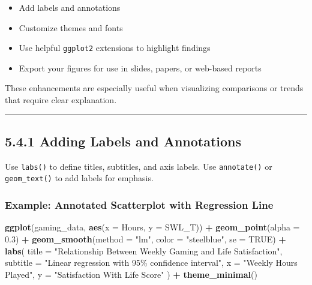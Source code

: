 \documentclass[
]{book}
\newenvironment{Shaded}{\begin{snugshade}}{\end{snugshade}}
\newcommand{\AttributeTok}[1]{\textcolor[rgb]{0.13,0.29,0.53}{#1}}
\newcommand{\ConstantTok}[1]{\textcolor[rgb]{0.56,0.35,0.01}{#1}}
\newcommand{\FloatTok}[1]{\textcolor[rgb]{0.00,0.00,0.81}{#1}}
\newcommand{\FunctionTok}[1]{\textcolor[rgb]{0.13,0.29,0.53}{\textbf{#1}}}
\newcommand{\NormalTok}[1]{#1}
\newcommand{\SpecialCharTok}[1]{\textcolor[rgb]{0.81,0.36,0.00}{\textbf{#1}}}
\newcommand{\StringTok}[1]{\textcolor[rgb]{0.31,0.60,0.02}{#1}}
\providecommand{\tightlist}{%
  \setlength{\itemsep}{0pt}\setlength{\parskip}{0pt}}
\begin{document}
\begin{itemize}
\tightlist
\item
  Add labels and annotations
\item
  Customize themes and fonts
\item
  Use helpful \texttt{ggplot2} extensions to highlight findings
\item
  Export your figures for use in slides, papers, or web-based reports
\end{itemize}

These enhancements are especially useful when visualizing comparisons or trends that require clear explanation.

\begin{center}\rule{0.5\linewidth}{0.5pt}\end{center}

\subsection{5.4.1 Adding Labels and Annotations}\label{adding-labels-and-annotations}

Use \texttt{labs()} to define titles, subtitles, and axis labels. Use \texttt{annotate()} or \texttt{geom\_text()} to add labels for emphasis.

\subsubsection{Example: Annotated Scatterplot with Regression Line}\label{example-annotated-scatterplot-with-regression-line}

\begin{Shaded}
\begin{Highlighting}[]
\FunctionTok{ggplot}\NormalTok{(gaming\_data, }\FunctionTok{aes}\NormalTok{(}\AttributeTok{x =}\NormalTok{ Hours, }\AttributeTok{y =}\NormalTok{ SWL\_T)) }\SpecialCharTok{+}
  \FunctionTok{geom\_point}\NormalTok{(}\AttributeTok{alpha =} \FloatTok{0.3}\NormalTok{) }\SpecialCharTok{+}
  \FunctionTok{geom\_smooth}\NormalTok{(}\AttributeTok{method =} \StringTok{"lm"}\NormalTok{, }\AttributeTok{color =} \StringTok{"steelblue"}\NormalTok{, }\AttributeTok{se =} \ConstantTok{TRUE}\NormalTok{) }\SpecialCharTok{+}
  \FunctionTok{labs}\NormalTok{(}
    \AttributeTok{title =} \StringTok{"Relationship Between Weekly Gaming and Life Satisfaction"}\NormalTok{,}
    \AttributeTok{subtitle =} \StringTok{"Linear regression with 95\% confidence interval"}\NormalTok{,}
    \AttributeTok{x =} \StringTok{"Weekly Hours Played"}\NormalTok{,}
    \AttributeTok{y =} \StringTok{"Satisfaction With Life Score"}
\NormalTok{  ) }\SpecialCharTok{+}
  \FunctionTok{theme\_minimal}\NormalTok{()}
\end{Highlighting}
\end{Shaded}
\end{document}
